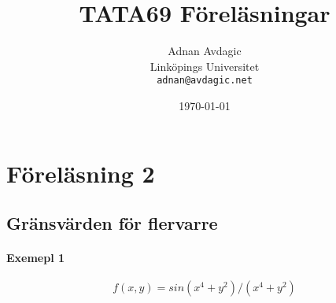 \documentclass{article}
\begin{document}
\title{TATA69 Föreläsningar}
\author{Adnan Avdagic\\
	Linköpings Universitet\\
	\texttt{adnan@avdagic.net}}
\date{\today}
\maketitle

\newpage


\section{Föreläsning 2}
\subsection{Gränsvärden för flervarre}

\paragraph{Exemepl 1}

\[f(x,y) = sin( x^4 + y^2 ) / (x^4 + y^2)\]
\end{document}
